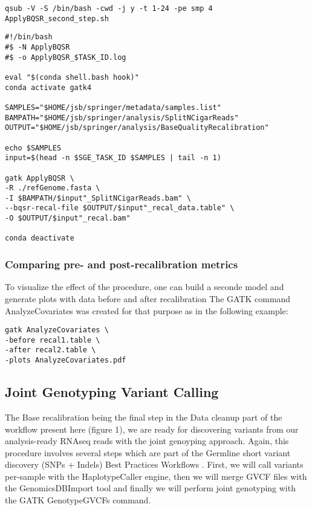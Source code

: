 \begin{verbatim}
qsub -V -S /bin/bash -cwd -j y -t 1-24 -pe smp 4  ApplyBQSR_second_step.sh
\end{verbatim}


\begin{verbatim}
#!/bin/bash
#$ -N ApplyBQSR
#$ -o ApplyBQSR_$TASK_ID.log

eval "$(conda shell.bash hook)"
conda activate gatk4

SAMPLES="$HOME/jsb/springer/metadata/samples.list"
BAMPATH="$HOME/jsb/springer/analysis/SplitNCigarReads"
OUTPUT="$HOME/jsb/springer/analysis/BaseQualityRecalibration"

echo $SAMPLES
input=$(head -n $SGE_TASK_ID $SAMPLES | tail -n 1)

gatk ApplyBQSR \
-R ./refGenome.fasta \
-I $BAMPATH/$input"_SplitNCigarReads.bam" \
--bqsr-recal-file $OUTPUT/$input"_recal_data.table" \
-O $OUTPUT/$input"_recal.bam"

conda deactivate
\end{verbatim}

\subsubsection{Comparing pre- and post-recalibration metrics}

To visualize the effect of the procedure, one can build a seconde model and generate plots with data before and after recalibration \cite{GATK_BaseQuality} The GATK command AnalyzeCovariates was created for that purpose as in the following example:

\begin{verbatim}
gatk AnalyzeCovariates \
-before recal1.table \
-after recal2.table \
-plots AnalyzeCovariates.pdf
\end{verbatim}



\subsection{Joint Genotyping Variant Calling}


The Base recalibration being the final step in the Data cleanup part of the workflow present here (figure 1), we are ready for discovering variants from our analysis-ready RNAseq reads with the joint genoyping approach. Again, this procedure involves several steps which are part of the Germline short variant discovery (SNPs + Indels) Best Practices Workflows \cite{GATK_BP_Germline}. First, we will call variants per-sample with the HaplotypeCaller engine, then we will merge GVCF files with the GenomicsDBImport tool and finally we will perform joint genotyping with the GATK GenotypeGVCFs command.




